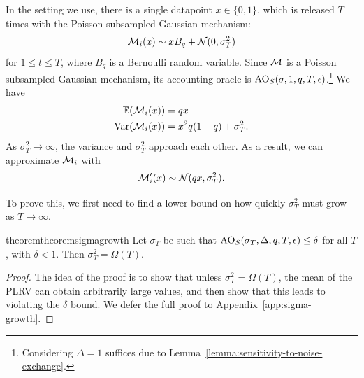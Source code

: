 \documentclass{article}
\theoremstyle{plain}
\theoremstyle{definition}
\theoremstyle{remark}
\begin{document}
In the setting we use, there is a single datapoint $x\in \{0, 1\}$,
which is released $T$ times with the Poisson subsampled Gaussian mechanism:
\begin{equation}
    \mathcal{M}_i(x) \sim xB_q + \mathcal{N}(0, \sigma^2_T)
\end{equation}
for $1\leq t \leq T$, where $B_q$ is a Bernoulli random variable.
Since $\mathcal{M}$ is a Poisson subsampled Gaussian mechanism, its accounting
oracle is $\mathrm{AO}_S(\sigma, 1, q, T, \epsilon)$.\footnote{
Considering $\Delta = 1$ suffices due to Lemma~\ref{lemma:sensitivity-to-noise-exchange}.
}
We have 
\begin{align}
    \operatorname{\mathbb{E}}(\mathcal{M}_i(x)) &= qx \\
    \operatorname{Var}(\mathcal{M}_i(x)) &= x^2q(1 - q) + \sigma_T^2.
\end{align}
As $\sigma_T^2\to \infty$, the variance and $\sigma_T^2$ approach each other.
As a result, we can approximate $\mathcal{M}_i$ with 
\begin{equation}
    \mathcal{M}_i'(x) \sim \mathcal{N}(qx, \sigma_T^2).
\end{equation}

To prove this, we first need to find a lower bound on how quickly 
$\sigma_T^2$ must grow as $T\to \infty$.
\begin{restatable}{theorem}{theoremsigmagrowth}\label{thm:sigma-growth}
    Let $\sigma_T$ be such that $\mathrm{AO}_S(\sigma_T, \Delta, q, T, \epsilon) \leq \delta$ for all 
    $T$, with $\delta < 1$. Then $\sigma_T^2 = \Omega(T)$.
\end{restatable}
\begin{proof}
    The idea of the proof is to show that unless $\sigma_T^2 = \Omega(T)$,
    the mean of the PLRV can obtain arbitrarily large values, and then
    show that this leads to violating the $\delta$ bound.
    We defer the full proof to Appendix~\ref{app:sigma-growth}.
\end{proof}
\end{document}
